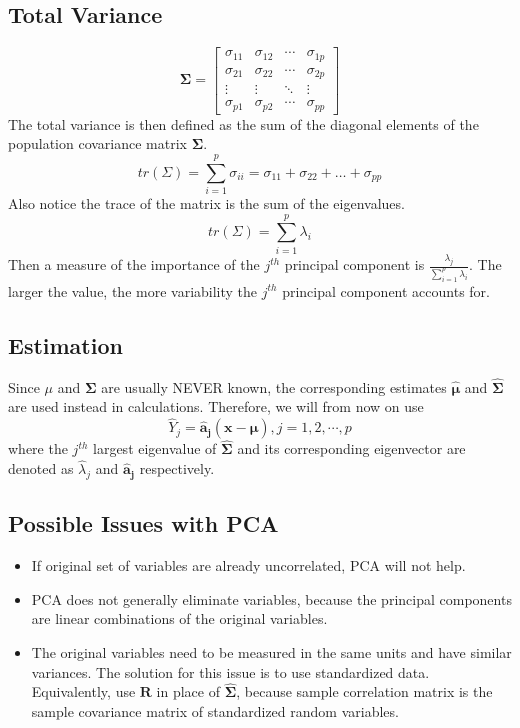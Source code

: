 \documentclass{article}
\begin{document}
\subsection{Total Variance}
\[\mathbf{\Sigma} = 
\begin{bmatrix}
\sigma_{11} & \sigma_{12} & \cdots & \sigma_{1p} \\ 
\sigma_{21} & \sigma_{22} & \cdots & \sigma_{2p} \\ 
\vdots & \vdots & \ddots & \vdots \\ 
\sigma_{p1} & \sigma_{p2} & \cdots & \sigma_{pp}
\end{bmatrix}\]
The total variance is then defined as the sum of the diagonal elements of the population covariance matrix $\mathbf{\Sigma}$.
\[tr(\Sigma)=\sum_{i=1}^p \sigma_{ii}=\sigma_{11}+\sigma_{22}+\hdots+\sigma_{pp}\]
Also notice the trace of the matrix is the sum of the eigenvalues.
\[tr(\Sigma)=\sum_{i=1}^p\lambda_i\]
Then a measure of the importance of the $j^{th}$ principal component is $\frac{\lambda_j}{\sum_{i=1}^p\lambda_i}$. The larger the value, the more variability the $j^{th}$ principal component accounts for.

\subsection{Estimation}
Since $\mu$ and $\mathbf{\Sigma}$ are usually NEVER known, the corresponding estimates $\mathbf{\hat{\mu}}$ and $\mathbf{\widehat{\Sigma}}$ are used instead in calculations. Therefore, we will from now on use $$\hat{Y}_j=\mathbf{\hat{a}_j}(\mathbf{x}-\mathbf{\hat{\mu}}), j=1,2,\cdots,p$$ where the $j^{th}$ largest eigenvalue of $\mathbf{\widehat{\Sigma}}$ and its corresponding eigenvector are denoted as $\hat{\lambda}_j$ and $\mathbf{\hat{a}_j}$ respectively.

\subsection{Possible Issues with PCA}
\begin{itemize}
    \item If original set of variables are already uncorrelated, PCA will not help.
    \item PCA does not generally eliminate variables, because the principal components are linear combinations of the original variables.
    \item The original variables need to be measured in the same units and have similar variances. The solution for this issue is to use standardized data. Equivalently, use $\mathbf{R}$ in place of $\mathbf{\widehat{\Sigma}}$, because sample correlation matrix is the sample covariance matrix of standardized random variables.
\end{itemize}
\end{document}

